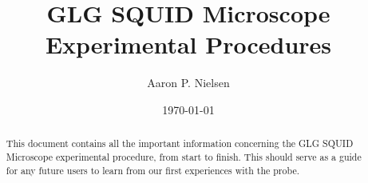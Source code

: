 \documentclass{article}
\title{GLG SQUID Microscope Experimental Procedures}
\author{Aaron P. Nielsen}
\date{\today}
\begin{document}
\maketitle

\begin{abstract}

This document contains all the important information
concerning the GLG SQUID Microscope experimental procedure, from start
to finish. This should serve as a guide for any future users to learn from 
our first experiences with the probe. 

\end{abstract}



\printindex
\end{document}
